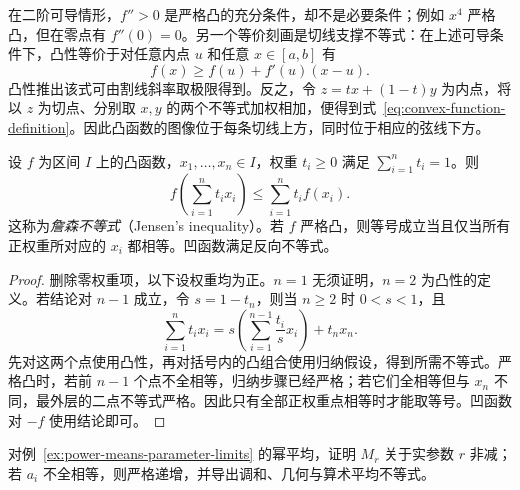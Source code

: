 在二阶可导情形，$f''>0$ 是严格凸的充分条件，却不是必要条件；例如 $x^4$ 严格凸，但在零点有 $f''(0)=0$。另一个等价刻画是切线支撑不等式：在上述可导条件下，凸性等价于对任意内点 $u$ 和任意 $x\in[a,b]$ 有
\begin{equation}
    f(x)\geq f(u)+f'(u)(x-u).
    \label{eq:convex-supporting-tangent}
\end{equation}
凸性推出该式可由割线斜率取极限得到。反之，令 $z=tx+(1-t)y$ 为内点，将以 $z$ 为切点、分别取 $x,y$ 的两个不等式加权相加，便得到式~\eqref{eq:convex-function-definition}。因此凸函数的图像位于每条切线上方，同时位于相应的弦线下方。

\begin{theorem}[詹森不等式]
\label{thm:jensen-finite-convex-combinations}
设 $f$ 为区间 $I$ 上的凸函数，$x_1,\ldots,x_n\in I$，权重 $t_i\geq0$ 满足 $\sum_{i=1}^n t_i=1$。则
\begin{equation}
    f\left(\sum_{i=1}^n t_ix_i\right)
    \leq\sum_{i=1}^n t_if(x_i).
    \label{eq:jensen-finite-convex-combinations}
\end{equation}
这称为\emph{詹森不等式}（Jensen's inequality）。若 $f$ 严格凸，则等号成立当且仅当所有正权重所对应的 $x_i$ 都相等。凹函数满足反向不等式。
\end{theorem}

\begin{proof}
删除零权重项，以下设权重均为正。$n=1$ 无须证明，$n=2$ 为凸性的定义。若结论对 $n-1$ 成立，令 $s=1-t_n$，则当 $n\geq2$ 时 $0<s<1$，且
\[
    \sum_{i=1}^nt_ix_i
    =s\left(\sum_{i=1}^{n-1}\frac{t_i}s x_i\right)+t_nx_n.
\]
先对这两个点使用凸性，再对括号内的凸组合使用归纳假设，得到所需不等式。严格凸时，若前 $n-1$ 个点不全相等，归纳步骤已经严格；若它们全相等但与 $x_n$ 不同，最外层的二点不等式严格。因此只有全部正权重点相等时才能取等号。凹函数对 $-f$ 使用结论即可。
\end{proof}

\begin{example}
\label{ex:power-mean-monotonicity-by-convexity}
对例~\ref{ex:power-means-parameter-limits} 的幂平均，证明 $M_r$ 关于实参数 $r$ 非减；若 $a_i$ 不全相等，则严格递增，并导出调和、几何与算术平均不等式。
\end{example}

